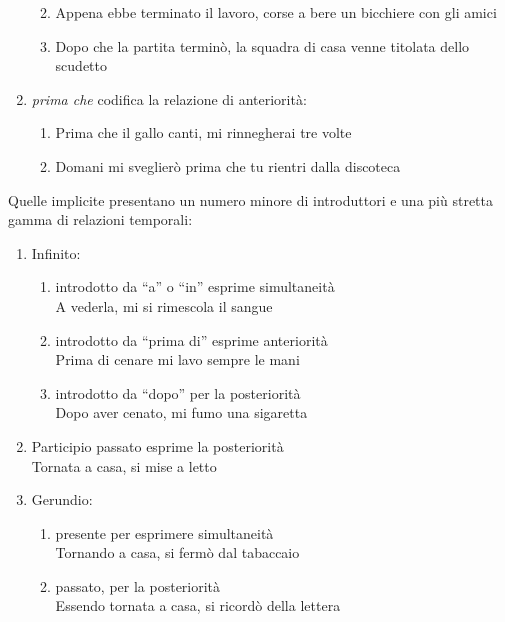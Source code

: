 \documentclass[
  a4paper,
  twoside,
  11pt,
  chapterprefix=false,
  bibliography=totocnumbered,
  listof=flat]{scrbook}
\providecommand{\tightlist}{%
  \setlength{\itemsep}{0pt}\setlength{\parskip}{0pt}}
\begin{document}
\begin{enumerate}
  \begin{enumerate}
  \def\labelenumii{\alph{enumii}.}
  \tightlist
  \item
    Appena ebbe terminato il lavoro, corse a bere un bicchiere con gli amici
  \item
    Dopo che la partita terminò, la squadra di casa venne titolata dello scudetto
  \end{enumerate}
\item
  \emph{prima che} codifica la relazione di anteriorità:

  \begin{enumerate}
  \def\labelenumii{\alph{enumii}.}
  \tightlist
  \item
    Prima che il gallo canti, mi rinnegherai tre volte
  \item
    Domani mi sveglierò prima che tu rientri dalla discoteca
  \end{enumerate}
\end{enumerate}

Quelle implicite presentano un numero minore di introduttori e una più stretta gamma di relazioni temporali:

\begin{enumerate}
\def\labelenumi{(\arabic{enumi})}
\setcounter{enumi}{117}
\item
  Infinito:

  \begin{enumerate}
  \def\labelenumii{\alph{enumii}.}
  \tightlist
  \item
    introdotto da \enquote{a} o \enquote{in} esprime simultaneità\\
    A vederla, mi si rimescola il sangue
  \item
    introdotto da \enquote{prima di} esprime anteriorità\\
    Prima di cenare mi lavo sempre le mani
  \item
    introdotto da \enquote{dopo} per la posteriorità\\
    Dopo aver cenato, mi fumo una sigaretta
  \end{enumerate}
\item
  Participio passato esprime la posteriorità\\
  Tornata a casa, si mise a letto
\item
  Gerundio:

  \begin{enumerate}
  \def\labelenumii{\alph{enumii}.}
  \tightlist
  \item
    presente per esprimere simultaneità\\
    Tornando a casa, si fermò dal tabaccaio
  \item
    passato, per la posteriorità\\
    Essendo tornata a casa, si ricordò della lettera
  \end{enumerate}
\end{enumerate}
\end{document}
